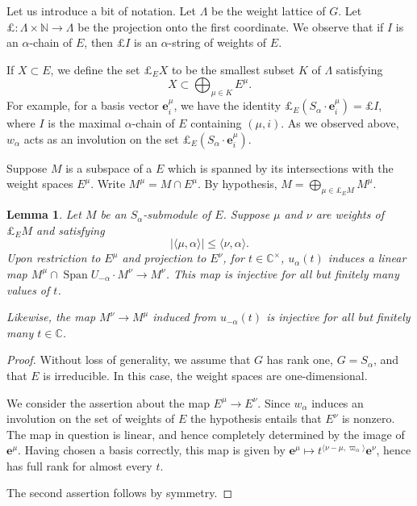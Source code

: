 \documentclass{amsart}
\theoremstyle{plain}
\newtheorem{lemma}[theorem]{Lemma}
\theoremstyle{definition}
\theoremstyle{remark}
\newcommand{\Vect}[1]{\mathbold{#1}}
\providecommand{\abs}[1]{\lvert#1\rvert}
\begin{document}
Let us introduce a bit of notation. Let $\Lambda$ be the weight lattice of $G$.
Let $\pounds: \Lambda \times \mathbb{N} \to \Lambda$ be the projection onto the first
coordinate. We observe that if $I$ is an $\alpha$-chain of $E$, then $\pounds I$ is an
$\alpha$-string of weights of $E$.

If $X \subset E$, we define the set $\pounds_{E} X$ to be the smallest subset $K$ of
$\Lambda$ satisfying
$$X \subset \bigoplus_{\mu \in K} E^{\mu}.$$
For example, for a basis vector $\Vect{e}^{\mu}_{i}$, we have the identity
$\pounds_{E}(S_{\alpha} \cdot \Vect{e}^{\mu}_{i}) = \pounds I$, where $I$ is the
maximal $\alpha$-chain of $E$ containing $(\mu, i)$.
As we observed above, $w_{\alpha}$ acts as an involution on the set $\pounds_{E}(S_{\alpha}
\cdot \Vect{e}^{\mu}_{i})$.

Suppose $M$ is a subspace of a $E$ which is spanned by its intersections with
the weight spaces $E^{\mu}$. Write $M^{\mu} = M \cap E^{\mu}$. By hypothesis, $M =
\bigoplus_{\mu \in \pounds_{E} M} M^{\mu}$.
\begin{lemma}\label{lem:unipotentorbits}
Let $M$ be an $S_{\alpha}$-submodule of $E$.
Suppose $\mu$ and $\nu$ are weights of $\pounds_{E} M$ and satisfying
$$\abs{\langle \mu, \alpha \rangle} \leqslant \langle \nu, \alpha \rangle.$$
Upon restriction to $E^{\mu}$ and projection to $E^{\nu}$, for $t \in \mathbb{C}^{\times}$, $u_{\alpha}(t)$
induces a linear map $M^{\mu} \cap \operatorname{Span} U_{-\alpha}
\cdot M^{\nu} \to M^{\nu}$. This map is injective for all but finitely many values of $t$.

Likewise, the map $M^{\nu} \to M^{\mu}$ induced from $u_{-\alpha}(t)$ is injective for all but finitely many
$t \in \mathbb{C}$.
\end{lemma}
\begin{proof}
Without loss of generality, we assume that
$G$ has rank one, $G = S_{\alpha}$, and that $E$ is irreducible. In this case, the weight
spaces are one-dimensional.

We consider the assertion about the map $E^{\mu} \to E^{\nu}$. Since $w_{\alpha}$
induces an involution on the set of weights of $E$ the hypothesis entails that $E^{\nu}$
is nonzero. The map in question is linear, and hence completely determined by the image
of $\Vect{e}^{\mu}$. Having chosen a basis correctly, this map is given by
$\Vect{e}^{\mu} \mapsto t^{\langle \nu - \mu, \varpi_{\alpha}\rangle} \Vect{e}^{\nu}$,
hence has full rank for almost every $t$.

The second assertion follows by symmetry.
\end{proof}
\end{document}
